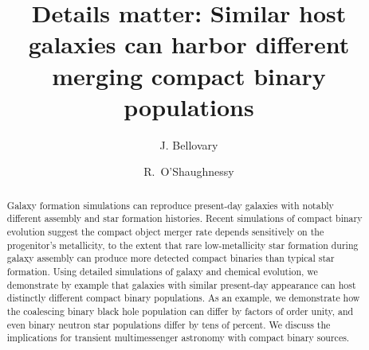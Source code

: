 \documentclass[nofootinbib,twocolumn,prd]{emulateapj}
\newcommand\jillianremark[1]{{\color{blue}#1}}
\begin{document}
\title{Details matter: Similar host galaxies can harbor different merging compact binary populations} 
\author{ J. Bellovary}
\author{R.\ O'Shaughnessy}
\begin{abstract}
Galaxy formation
simulations can reproduce present-day galaxies with notably different assembly and star formation histories.  
Recent simulations of compact binary evolution suggest the compact object merger rate depends
sensitively on the progenitor's metallicity, to the extent that rare low-metallicity star formation during galaxy
assembly can produce more detected compact binaries than typical star formation.   
Using detailed simulations of galaxy and chemical evolution, we demonstrate by example that galaxies with similar present-day appearance can host distinctly different
compact binary populations.  As an example, we demonstrate how the coalescing binary black hole population can differ by
factors of order  unity, and even binary neutron star populations differ by tens of percent.  
We discuss the implications for transient multimessenger astronomy with compact binary sources. 

\end{abstract}
\end{document}
